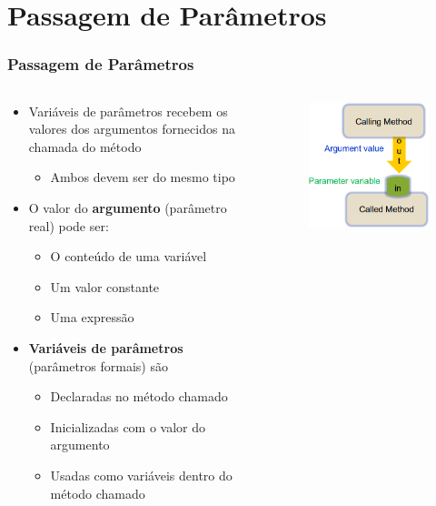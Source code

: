 \documentclass[xcolor={dvipsnames,table},aspectratio=169]{beamer}
\begin{document}
\section{Passagem de Parâmetros}

\begin{frame}\frametitle{Passagem de Parâmetros}
\begin{columns}[T]
	\begin{column}{0.7\linewidth}
\begin{itemize}
	\item Variáveis de parâmetros recebem os valores dos argumentos fornecidos na chamada do método
	\begin{itemize}
		\item Ambos devem ser do mesmo tipo
	\end{itemize}
	\item O valor do \textbf{argumento} (parâmetro real) pode ser:
	\begin{itemize}
		\item O conteúdo de uma variável
		\item Um valor constante
		\item Uma expressão
	\end{itemize}
	\item \textbf{Variáveis de parâmetros} (parâmetros formais) são
	\begin{itemize}
		\item Declaradas no método chamado
		\item Inicializadas com o valor do argumento
		\item Usadas como variáveis dentro do método chamado
	\end{itemize}
\end{itemize}
	\end{column}
	\begin{column}{0.3\linewidth}
\begin{figure}[h]
	\includegraphics[height=0.5\paperheight,center]{pucrs-ep-fprog-unidade_05-metodos-laminas-passagem_de_parametros.png}

\end{figure}
\end{column}
\end{columns}
\end{frame}
\end{document}
